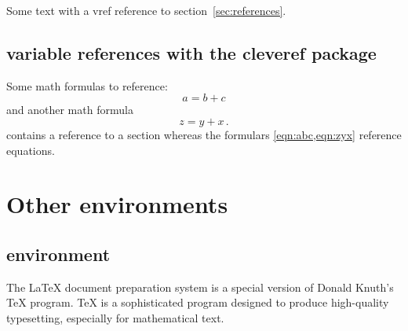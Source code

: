 \begin{filecontents*}{\democodefile}
Some text with a vref reference 
to section~\vref{sec:references}.
\end{filecontents*}

%

\subsection{variable references with the cleveref package}

\begin{filecontents*}{\democodefile}
Some math formulas to reference:
\begin{equation}
a = b + c \label{eqn:abc}
\end{equation}
and another math formula
\begin{equation}
z = y + x\,. \label{eqn:zyx}
\end{equation}
 contains a reference to a section
whereas the formulars \cref{eqn:abc,eqn:zyx} 
reference equations.
\end{filecontents*}

%
%
\section{Other environments}
\subsection{ environment}

\begin{filecontents*}{\democodefile}
\begin{abstract}
\LaTeX{} is a document markup language and document preparation 
system for the \TeX{} typesetting program.
\end{abstract}
The \LaTeX{} document preparation system is a special version of Donald
Knuth's \TeX{} program. \TeX{} is a sophisticated program designed to 
produce high-quality typesetting, especially for mathematical text.
\end{filecontents*}

